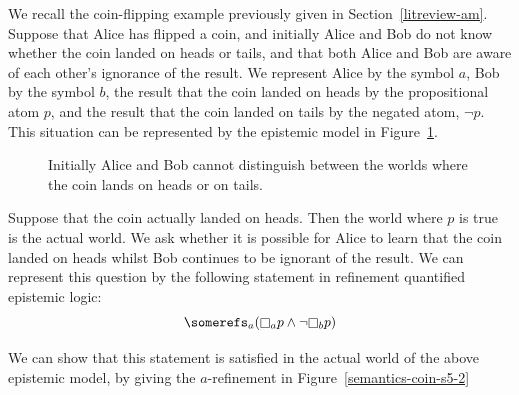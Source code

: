 \begin{example}\label{semantics-coin-s5}
We recall the coin-flipping example previously given in
Section~\ref{litreview-am}.  Suppose that Alice has flipped a coin, and
initially Alice and Bob do not know whether the coin landed on heads or tails,
and that both Alice and Bob are aware of each other's ignorance of the result.
We represent Alice by the symbol $a$, Bob by the symbol $b$, the result that the
coin landed on heads by the propositional atom $p$, and the result that the coin
landed on tails by the negated atom, $\neg p$. This situation can be represented
by the epistemic model in Figure~\ref{semantics-coin-s5-1}.

\begin{figure}[b]
\begin{center} 
\caption{\label{semantics-coin-s5-1}
Initially Alice and Bob cannot distinguish between the worlds where the coin
lands on heads or on tails.
}
\end{center}
\end{figure}

Suppose that the coin actually landed on heads. Then the world where $p$ is true
is the actual world. We ask whether it is possible for Alice to learn that the
coin landed on heads whilst Bob continues to be ignorant of the result. We can
represent this question by the following statement in refinement quantified
epistemic logic:
$$\somerefs_a (\knows_a p \land \neg \knows_b p)$$ 

We can show that this statement is satisfied in the actual world of the above
epistemic model, by giving the $a$-refinement in Figure~\ref{semantics-coin-s5-2}


\end{example}
